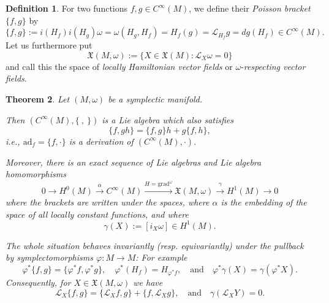 \documentclass{article}
\newtheorem{theorem}{Theorem}
\theoremstyle{definition}
\newtheorem{definition}[theorem]{Definition}
\begin{document}
\begin{definition}
    For two functions \( f, g \in C^\infty(M) \), we define their \textit{Poisson bracket} \( \{f, g\} \) by
    \begin{equation}
        \{f, g\} := i(H_f)i(H_g)\omega = \omega(H_g, H_f) = H_f(g) = \mathcal{L}_{H_f} g = dg(H_f) \in C^\infty(M).
    \end{equation}
    Let us furthermore put
    \begin{equation}
        \mathfrak{X}(M, \omega) := \{ X \in \mathfrak{X}(M) : \mathcal{L}_X \omega = 0 \}
    \end{equation}
    and call this the space of \textit{locally Hamiltonian vector fields} or \(\omega\)-\textit{respecting vector fields}.

\end{definition}


\begin{theorem}
    Let $(M, \omega)$ be a symplectic manifold.

    Then $(C^\infty(M), \{ \ , \ \})$ is a Lie algebra which also satisfies 
    \[
    \{f, gh\} = \{f, g\}h + g\{f, h\},
    \]
    i.e., $\mathrm{ad}_f = \{f, \cdot\}$ is a derivation of $(C^\infty(M), \cdot)$.

    Moreover, there is an exact sequence of Lie algebras and Lie algebra homomorphisms
    \[
    0 \longrightarrow H^0(M) \xrightarrow{\alpha} C^\infty(M) \xrightarrow{H = \mathrm{grad}^\omega} \mathfrak{X}(M, \omega) \xrightarrow{\gamma} H^1(M) \longrightarrow 0
    \]
    where the brackets are written under the spaces, where $\alpha$ is the embedding of the space of all locally constant functions, and where 
    \[
    \gamma(X) := [i_X \omega] \in H^1(M).
    \]

    The whole situation behaves invariantly (resp. equivariantly) under the pullback by symplectomorphisms $\varphi: M \to M$: For example 
    \[
    \varphi^*\{f, g\} = \{\varphi^* f, \varphi^* g\}, \quad \varphi^*(H_f) = H_{\varphi^* f}, \quad \text{and} \quad \varphi^*\gamma(X) = \gamma(\varphi^* X).
    \]
    Consequently, for $X \in \mathfrak{X}(M, \omega)$ we have 
    \[
    \mathcal{L}_X \{f, g\} = \{\mathcal{L}_X f, g\} + \{f, \mathcal{L}_X g\}, \quad \text{and} \quad \gamma(\mathcal{L}_X Y) = 0.
    \]
\end{theorem}
\end{document}
